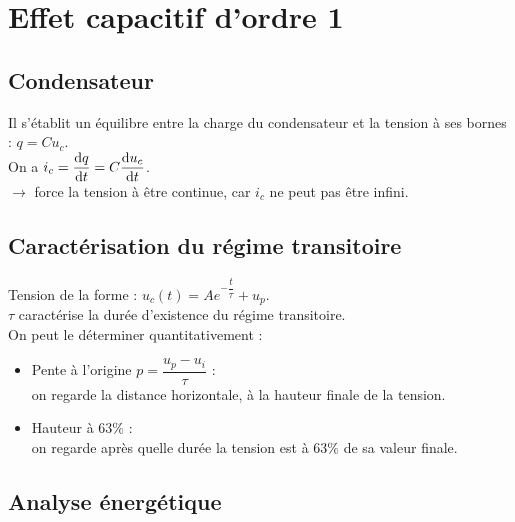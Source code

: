 \documentclass[13pt, twoside, a4paper, french]{report}
\begin{document}
        
        \section{Effet capacitif d'ordre 1}\label{sec:effet-capacitif-d'ordre-1}
            
            \subsection{Condensateur}\label{subsec:condensateur}
                
                Il s'établit un équilibre entre la charge du condensateur et la tension à ses bornes : $q = C u_c$.\\
                
                On a $i_c = \dfrac{\textrm d q}{\textrm d t} = C \dfrac{\textrm d u_c}{\textrm d t}$.\\
                $\rightarrow$ force la tension à être continue, car $i_c$ ne peut pas être infini.\\
            
            \subsection{Caractérisation du régime transitoire}\label{subsec:caracterisation-du-regime-transitoire}
                
                Tension de la forme : $u_c(t) = A e^{-\dfrac{t}{\tau}} + u_p$.\\
                
                $\tau$ caractérise la durée d'existence du régime transitoire.\\
                On peut le déterminer quantitativement :
                \begin{itemize}
                    \item Pente à l'origine $p = \dfrac{u_p - u_i}{\tau}$ :\\
                    on regarde la distance horizontale, à la hauteur finale de la tension.
                    \item Hauteur à $63\%$ :\\
                    on regarde après quelle durée la tension est à $63\%$ de sa valeur finale.
                \end{itemize}
            
            \subsection{Analyse énergétique}\label{subsec:analyse-energetique}
                
\end{document}
